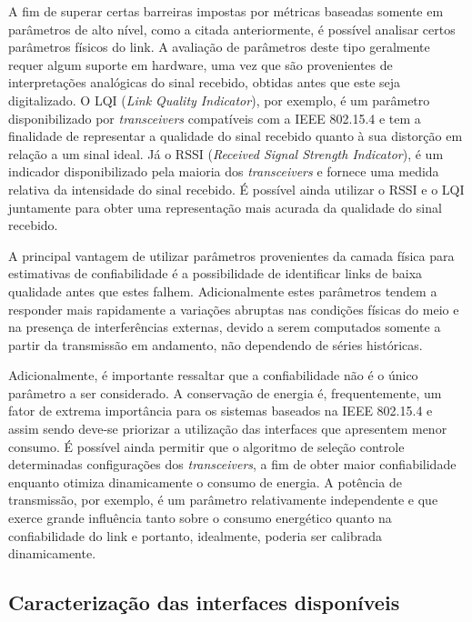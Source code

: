\documentclass{article}
\begin{document}
	A fim de superar certas barreiras impostas por métricas baseadas somente em parâmetros de alto nível, como a citada anteriormente, é possível analisar certos parâmetros físicos do link. A avaliação de parâmetros deste tipo geralmente requer algum suporte em hardware, uma vez que são provenientes de interpretações analógicas do sinal recebido, obtidas antes que este seja digitalizado. O LQI (\textit{Link Quality Indicator}), por exemplo, é um parâmetro disponibilizado por \textit{transceivers} compatíveis com a IEEE 802.15.4 e tem a finalidade de representar a qualidade do sinal recebido quanto à sua distorção em relação a um sinal ideal. Já o RSSI (\textit{Received Signal Strength Indicator}), é um indicador disponibilizado pela maioria dos \textit{transceivers} e fornece uma medida relativa da intensidade do sinal recebido. É possível ainda utilizar o RSSI e o LQI juntamente para obter uma representação mais acurada da qualidade do sinal recebido.
	
	A principal vantagem de utilizar parâmetros provenientes da camada física para estimativas de confiabilidade é a possibilidade de identificar links de baixa qualidade antes que estes falhem. Adicionalmente estes parâmetros tendem a responder mais rapidamente a variações abruptas nas condições físicas do meio e na presença de interferências externas, devido a serem computados somente a partir da transmissão em andamento, não dependendo de séries históricas. 

	Adicionalmente, é importante ressaltar que a confiabilidade não é o único parâmetro a ser considerado. A conservação de energia é, frequentemente, um fator de extrema importância para os sistemas baseados na IEEE 802.15.4 e assim sendo deve-se priorizar a utilização das interfaces que apresentem menor consumo. É possível ainda permitir que o algoritmo de seleção controle determinadas configurações dos \textit{transceivers}, a fim de obter maior confiabilidade enquanto otimiza dinamicamente o consumo de energia. A potência de transmissão, por exemplo, é um parâmetro relativamente independente e que exerce grande influência tanto sobre o consumo energético quanto na confiabilidade do link e portanto, idealmente, poderia ser calibrada dinamicamente.

\subsection{Caracterização das interfaces disponíveis}

\clearpage
\end{document}
